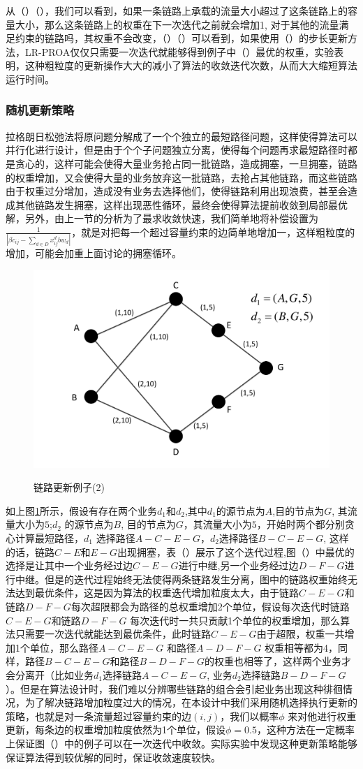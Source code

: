 从（）（），我们可以看到，如果一条链路上承载的流量大小超过了这条链路上的容量大小，那么这条链路上的权重在下一次迭代之前就会增加1, 对于其他的流量满足约束的链路吗，其权重不会改变，（）（）可以看到，如果使用（）的步长更新方法，LR-PROA仅仅只需要一次迭代就能够得到例子中（）最优的权重，实验表明，这种粗粒度的更新操作大大的减小了算法的收敛迭代次数，从而大大缩短算法运行时间。
\subsubsection{随机更新策略}

拉格朗日松弛法将原问题分解成了一个个独立的最短路径问题，这样使得算法可以并行化进行设计，但是由于个个子问题独立分离，使得每个问题再求最短路径时都是贪心的，这样可能会使得大量业务抢占同一批链路，造成拥塞，一旦拥塞，链路的权重增加，又会使得大量的业务放弃这一批链路，去抢占其他链路，而这些链路由于权重过分增加，造成没有业务去选择他们，使得链路利用出现浪费，甚至会造成其他链路发生拥塞，这样出现恶性循环，最终会使得算法提前收敛到局部最优解，另外，由上一节的分析为了最求收敛快速，我们简单地将补偿设置为$\frac{1}{|\beta c_{ij}-\sum\limits_{d \in D} x_{ij}^d bw_d|}$，就是对把每一个超过容量约束的边简单地增加一，这样粗粒度的增加，可能会加重上面讨论的拥塞循环。
\begin{figure}
\setlength{\belowcaptionskip}{-0.1cm}
  \begin{center}
    {\includegraphics[width=0.4 \textwidth]{figures/random.pdf}}
    \end{center}
  \caption{{\footnotesize{链路更新例子(2)}}}
  \label{u1}
\end{figure}
  如上图\ref{u1}所示，假设有存在两个业务$d_1$和$d_2$,其中$d_1$的源节点为$A$,目的节点为$G$, 其流量大小为$5$;$d_2$ 的源节点为$B$, 目的节点为$G$，其流量大小为$5$，开始时两个都分别贪心计算最短路径，$d_1$ 选择路径$A-C-E-G$，$d_2$选择路径$B-C-E-G$, 这样的话，链路$C-E$和$E-G$出现拥塞，表（）展示了这个迭代过程,图（）中最优的选择是让其中一个业务经过边$C-E-G$进行中继,另一个业务经过边$D-F-G$进行中继。但是的迭代过程始终无法使得两条链路发生分离，图中的链路权重始终无法达到最优条件，这是因为算法的权重迭代增加粒度太大，由于链路$C-E-G$和链路$D-F-G$每次超限都会为路径的总权重增加2个单位，假设每次迭代时链路$C-E-G$和链路$D-F-G$ 每次迭代时一共只贡献1个单位的权重增加，那么算法只需要一次迭代就能达到最优条件，此时链路$C-E-G$由于超限，权重一共增加1个单位，那么路径$A-C-E-G$ 和路径$A-D-F-G$ 权重相等都为4，同样，路径$B-C-E-G$和路径$B-D-F-G$的权重也相等了，这样两个业务才会分离开（比如业务$d_1$选择链路$A-C-E-G$, 业务$d_2$选择链路$B-D-F-G$）。但是在算法设计时，我们难以分辨哪些链路的组合会引起业务出现这种徘徊情况，为了解决链路增加粒度过大的情况，在本设计中我们采用随机选择执行更新的策略，也就是对一条流量超过容量约束的边$(i,j)$，我们以概率$\phi$ 来对他进行权重更新，每条边的权重增加粒度依然为1个单位，假设$\phi=0.5$，这种方法在一定概率上保证图（）中的例子可以在一次迭代中收敛。实际实验中发现这种更新策略能够保证算法得到较优解的同时，保证收敛速度较快。
